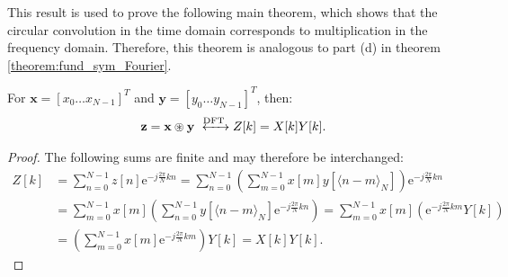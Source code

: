 This result is used to prove the following main theorem, which shows that the circular convolution in the time domain corresponds to multiplication in the frequency domain. Therefore, this theorem is analogous to part (d) in theorem \ref{theorem:fund_sym_Fourier}.

\begin{theorem}
For $\textbf{x} = [x_0 \dots x_{N-1}]^T$ and $\textbf{y} = [y_0 \dots y_{N-1}]^T$, then:
\begin{align*}
\textbf{z} = \textbf{x} \circledast \textbf{y} \xleftrightarrow{\text{DFT}} Z[k] = X[k] Y[k].
\end{align*}
\end{theorem}

\begin{proof}
The following sums are finite and may therefore be interchanged:
\begin{align*}
Z[k] &= \sum_{n=0}^{N-1} z[n] \text{e}^{-j\frac{2\pi}{N}kn} = \sum_{n=0}^{N-1} \left( \sum_{m=0}^{N-1} x[m] y[\langle n-m\rangle_N] \right) \text{e}^{-j\frac{2\pi}{N}kn} \\
&= \sum_{m=0}^{N-1} x[m] \left( \sum_{n=0}^{N-1} y[\langle n-m\rangle_N]\text{e}^{-j\frac{2\pi}{N}kn} \right) = \sum_{m=0}^{N-1} x[m] \left( \text{e}^{-j\frac{2\pi}{N}km}Y[k] \right) \\
&= \left( \sum_{m=0}^{N-1} x[m] \text{e}^{-j\frac{2\pi}{N}km} \right)Y[k] = X[k] Y[k].
\end{align*}
\end{proof}
%
%
